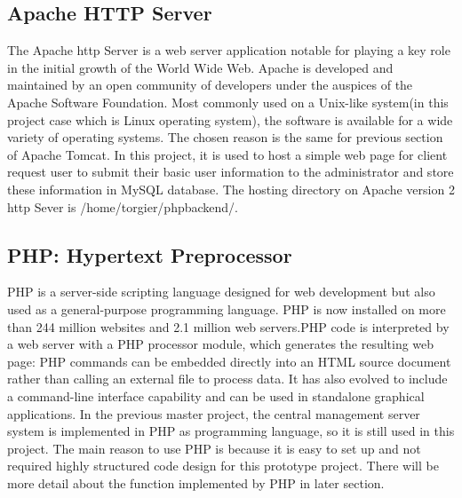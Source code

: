 \subsection{Apache HTTP Server}
\par The Apache \gls{http} Server is a web server application notable for playing a key role in the initial growth of the World Wide Web. Apache is developed and maintained by an open community of developers under the auspices of the Apache Software Foundation. Most commonly used on a Unix-like system(in this project case which is Linux operating system), the software is available for a wide variety of operating systems. The chosen reason is the same for previous section of Apache Tomcat. In this project, it is used to host a simple web page for client request user to submit their basic user information to the administrator and store these information in MySQL\cite{mysql} database. The hosting directory on Apache version 2 \gls{http} Sever is /home/torgier/phpbackend/.

\subsection{PHP: Hypertext Preprocessor}
\par PHP is a server-side scripting language designed for web development but also used as a general-purpose programming language. PHP is now installed on more than 244 million websites and 2.1 million web servers.PHP code is interpreted by a web server with a PHP processor module, which generates the resulting web page: PHP commands can be embedded directly into an HTML source document rather than calling an external file to process data. It has also evolved to include a command-line interface capability and can be used in standalone graphical applications. In the previous master project, the central management server system is implemented in PHP as programming language, so it is still used in this project. The main reason to use PHP is because it is easy to set up and not required highly structured code design for this prototype project. There will be more detail about the function implemented by PHP in later section.

